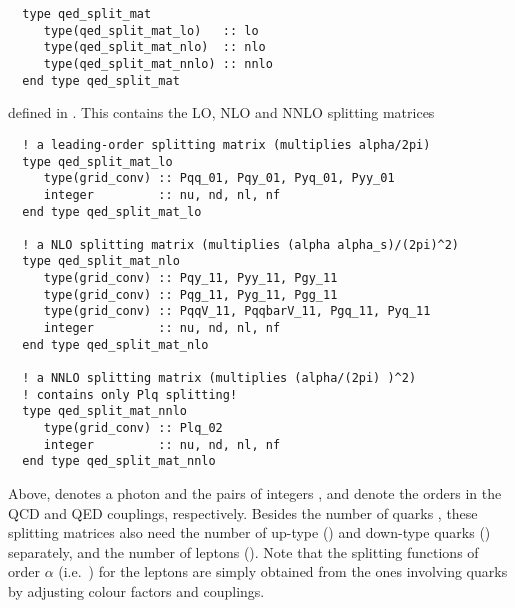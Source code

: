 \begin{lstlisting}
  type qed_split_mat
     type(qed_split_mat_lo)   :: lo
     type(qed_split_mat_nlo)  :: nlo
     type(qed_split_mat_nnlo) :: nnlo
  end type qed_split_mat
\end{lstlisting}
defined in . 
This contains the LO, NLO and NNLO splitting matrices 
\begin{lstlisting}
  ! a leading-order splitting matrix (multiplies alpha/2pi)
  type qed_split_mat_lo
     type(grid_conv) :: Pqq_01, Pqy_01, Pyq_01, Pyy_01
     integer         :: nu, nd, nl, nf
  end type qed_split_mat_lo

  ! a NLO splitting matrix (multiplies (alpha alpha_s)/(2pi)^2)
  type qed_split_mat_nlo
     type(grid_conv) :: Pqy_11, Pyy_11, Pgy_11
     type(grid_conv) :: Pqg_11, Pyg_11, Pgg_11
     type(grid_conv) :: PqqV_11, PqqbarV_11, Pgq_11, Pyq_11
     integer         :: nu, nd, nl, nf
  end type qed_split_mat_nlo

  ! a NNLO splitting matrix (multiplies (alpha/(2pi) )^2) 
  ! contains only Plq splitting!
  type qed_split_mat_nnlo 
     type(grid_conv) :: Plq_02
     integer         :: nu, nd, nl, nf
  end type qed_split_mat_nnlo
\end{lstlisting}     
%
Above,  denotes a photon and the pairs of integers ,
 and  denote the orders in the QCD and QED couplings,
respectively. Besides the number of quarks , these splitting
matrices also need the number of up-type () and down-type
quarks () separately, and the number of leptons ().
%
Note that the splitting functions of order $\alpha$ (i.e.\ )
for the leptons are simply obtained from the ones
involving quarks by adjusting colour factors and couplings.

